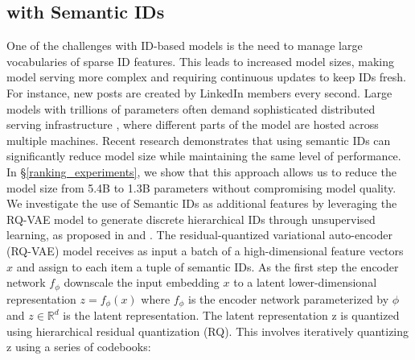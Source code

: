 \subsection{{\systemname} with Semantic IDs}\label{sec:gr_semantic_IDs}
One of the challenges with ID-based models is the need to manage large vocabularies of sparse ID features. This leads to increased model sizes, making model serving more complex and requiring continuous updates to keep IDs fresh. For instance, new posts are created by LinkedIn members every second. Large models with trillions of parameters often demand sophisticated distributed serving infrastructure \cite{HSTU_paper_zhai24a}, where different parts of the model are hosted across multiple machines.
Recent research demonstrates that using semantic IDs \cite{singh2024bettergeneralizationsemanticids} can significantly reduce model size while maintaining the same level of performance. In \S\ref{ranking_experiments}, we show that this approach allows us to reduce the model size from 5.4B to 1.3B parameters without compromising model quality.
We investigate the use of Semantic IDs as additional features by leveraging the RQ-VAE model to generate discrete hierarchical IDs through unsupervised learning, as proposed in \cite{rajput2023recommendersystemsgenerativeretrieval} and \cite{singh2024bettergeneralizationsemanticids}. The residual-quantized variational auto-encoder (RQ-VAE) model receives as input a batch of a high-dimensional feature vectors $x$ and assign to each item a tuple of semantic IDs. As the first step the encoder network $f_\phi$ downscale the input embedding $x$ to a latent lower-dimensional representation $z = f_\phi(x)$
where $f_\phi$ is the encoder network parameterized by $\phi$ and $z \in \mathbb{R}^d$ is the latent representation.
The latent representation z is quantized using hierarchical residual quantization (RQ). This involves iteratively quantizing z using a series of codebooks:

